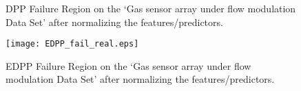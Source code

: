 \documentclass{article}
\begin{document}
\begin{figure}
    \centering
    \qquad
    \caption{DPP Failure Region on the `Gas sensor array under flow modulation Data Set' after normalizing the features/predictors.}
	\label{fig:DPP_fail_real}
\end{figure}

\begin{figure}
    \centering
    {\texttt{[image: EDPP\_fail\_real.eps]} }
    \caption{EDPP Failure Region on the `Gas sensor array under flow modulation Data Set' after normalizing the features/predictors.}
	\label{fig:EDPP_fail_real}
\end{figure}




\end{document}
